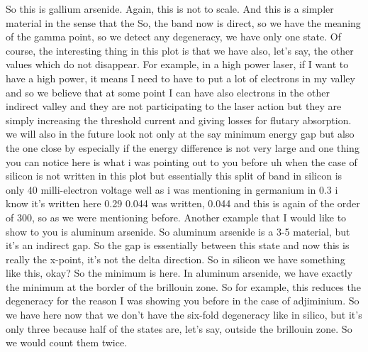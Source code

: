 So this is gallium arsenide. Again, this is not to scale. And this is a simpler material in the sense that the So, the band now is direct, so we have the meaning of the gamma point, so we detect any degeneracy, we have only one state. Of course, the interesting thing in this plot is that we have also, let's say, the other values which do not disappear. For example, in a high power laser, if I want to have a high power, it means I need to have to put a lot of electrons in my valley and so we believe that at some point I can have also electrons in the other indirect valley and they are not participating to the laser action but they are simply increasing the threshold current and giving losses for flutary absorption. we will also in the future look not only at the say minimum energy gap but also the one close by especially if the energy difference is not very large and one thing you can notice here is what i was pointing out to you before uh when the case of silicon is not written in this plot but essentially this split of band in silicon is only 40 milli-electron voltage well as i was mentioning in germanium in 0.3 i know it's written here 0.29 0.044 was written, 0.044 and this is again of the order of 300, so as we were mentioning before. Another example that I would like to show to you is aluminum arsenide. So aluminum arsenide is a 3-5 material, but it's an indirect gap. So the gap is essentially between this state and now this is really the x-point, it's not the delta direction. So in silicon we have something like this, okay? So the minimum is here. In aluminum arsenide, we have exactly the minimum at the border of the brillouin zone. So for example, this reduces the degeneracy for the reason I was showing you before in the case of adjiminium. So we have here now that we don't have the six-fold degeneracy like in silico, but it's only three because half of the states are, let's say, outside the brillouin zone. So we would count them twice.
